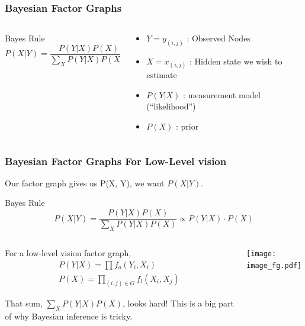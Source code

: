 \documentclass[compress]{beamer}
\begin{document}
\begin{frame}
\frametitle{Bayesian Factor Graphs}
\begin {columns}
  \begin{column}{5cm}
    \begin{block}{Bayes Rule} 
      \begin{equation*}
        P(X | Y ) = \frac{P(Y | X) P(X)}{\sum_XP(Y|X)P(X)}
      \end{equation*}
    \end{block}
  \end{column}
  \begin{column}{5cm}
    \begin{itemize}
    \item $Y = {y_{(i, j)}}$ : Observed Nodes
    \item $X = {x_{(i, j)}}$ : Hidden state we wish to estimate
    \item $P(Y | X) $ : measurement model (``likelihood'')
    \item $P(X) $ : prior 

    \end{itemize}
  \end{column}
  
  \end{columns}
\end{frame}

\begin{frame}
\frametitle{Bayesian Factor Graphs For Low-Level vision}
Our factor graph gives us P(X, Y), we want $P(X | Y)$. 

\begin{block}{Bayes Rule} 
  \begin{equation*}
    P(X | Y ) = \frac{P(Y | X) P(X)}{\sum_XP(Y|X)P(X)} \propto P(Y | X) \cdot  P(X)
  \end{equation*}
\end{block}
\begin{columns}
  \begin{column}{5cm}
    For a low-level vision factor graph,
    \begin{eqnarray*}
      P(Y | X) =  \prod f_o(Y_i,  X_i) \\
      P(X) = \prod_{(i, j) \in G} f_l(X_i, X_j)
    \end{eqnarray*}
    
    That sum, $\sum_XP(Y|X)P(X)$, looks hard! This is a big part of why 
    Bayesian inference is tricky. 
    \end{column}
    \begin{column}{6cm}
      \texttt{[image: image\_fg.pdf]}
    \end{column}

  \end{columns}
\end{frame}
\end{document}
